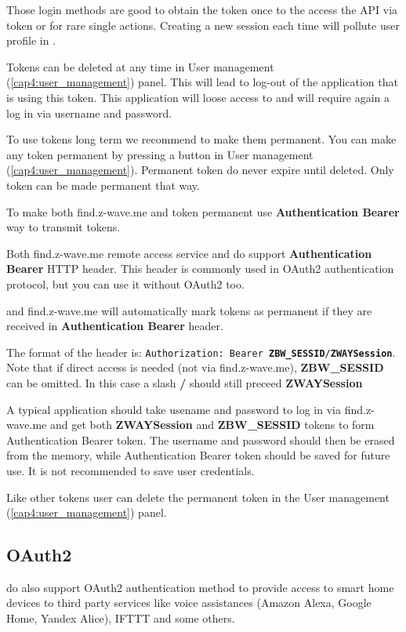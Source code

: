 Those login methods are good to obtain the token once to the access the API via token or for rare single actions. Creating a new session each time will pollute user profile in \zway.

Tokens can be deleted at any time in User management (\ref{cap4:user_management}) panel. This will lead to log-out of the application that is using this token. This application will loose access to \zway and will require again a log in via username and password.

To use tokens long term we recommend to make them permanent. You can make any token permanent by pressing a button in User management (\ref{cap4:user_management}).
Permanent token do never expire until deleted. Only \zway token can be made permanent that way.

To make both find.z-wave.me and \zway token permanent use \textbf{Authentication Bearer} way to transmit tokens.

Both find.z-wave.me remote access service and \zway do support \textbf{Authentication Bearer} HTTP header. This header is commonly used in OAuth2 authentication protocol, but you can use it without OAuth2 too.

\zway and find.z-wave.me will automatically mark tokens as permanent if they are received in \textbf{Authentication Bearer} header.

The format of the header is: \texttt{Authorization: Bearer \textbf{ZBW\_SESSID}/\textbf{ZWAYSession}}.
Note that if direct access is needed (not via find.z-wave.me), \textbf{ZBW\_SESSID} can be omitted.
In this case a slash \textbf{/} should still preceed \textbf{ZWAYSession}

A typical application should take usename and password to log in via find.z-wave.me and get both \textbf{ZWAYSession} and \textbf{ZBW\_SESSID} tokens to form Authentication Bearer token.
The username and password should then be erased from the memory, while Authentication Bearer token should be saved for future use. It is not recommended to save user credentials.

Like other tokens user can delete the permanent token in the User management (\ref{cap4:user_management}) panel.

\subsection{OAuth2}
\label{cap:authentication_oauth2}

\zway do also support OAuth2 authentication method to provide access to smart home devices to third party services like voice assistances (Amazon Alexa, Google Home, Yandex Alice), IFTTT and some others.


